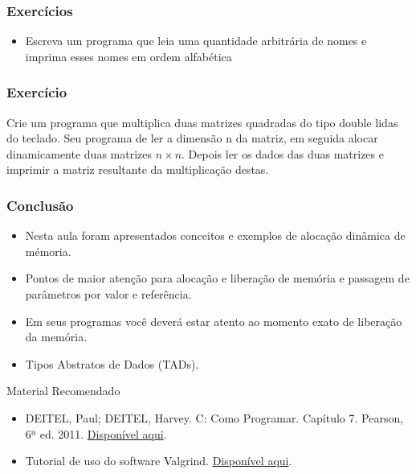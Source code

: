 \documentclass[aspectratio=169]{beamer}
\begin{document}
\begin{frame}
  \frametitle{Exercícios}
\begin{itemize}
\item Escreva um programa que leia uma quantidade arbitrária de nomes e imprima esses nomes em ordem alfabética
\end{itemize}
\end{frame}


\begin{frame}
\frametitle{Exercício}
Crie um programa que multiplica duas matrizes quadradas do tipo double lidas do teclado. Seu programa de ler a dimensão n da matriz, em seguida alocar dinamicamente duas matrizes $n \times n$. Depois ler os dados das duas matrizes e imprimir a matriz resultante da multiplicação destas.
\end{frame}


\begin{frame}
\frametitle{Conclusão}
\begin{itemize}
\item Nesta aula foram apresentados conceitos e exemplos de alocação dinâmica de mémoria.
\item Pontos de maior atenção para alocação e liberação de memória e passagem de parâmetros por valor e referência.
\item Em seus programas você deverá estar atento ao momento
exato de liberação da memória.
\item Tipos Abstratos de Dados (TADs).
\end{itemize}
\end{frame}


\begin{frame}{Material Recomendado}
\begin{itemize}
\item DEITEL, Paul; DEITEL, Harvey. C: Como Programar. Capítulo 7. Pearson, 6ª ed. 2011. \textcolor{blue}{ \href{http://www.inf.ufsc.br/~bosco.sobral/ensino/ine5201-02202A/Deitel_-_C_Como_programar_-_6a_edicao.pdf}{Disponível aqui}. } 
\item Tutorial de uso do software Valgrind. \textcolor{blue}{ \href{https://www.ic.unicamp.br/~rafael/materiais/valgrind.html}{Disponível aqui}. } 
\end{itemize}
\end{frame}

\end{document}
